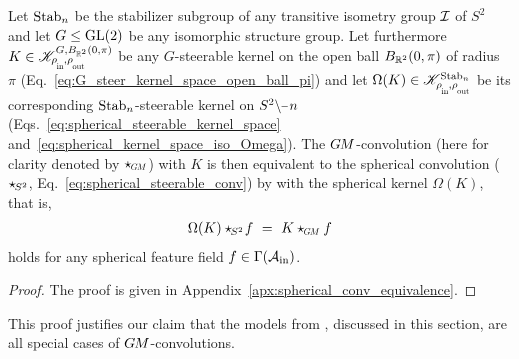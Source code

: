 \begin{thm}
\label{thm:spherical_conv_GM_conv}
    Let $\operatorname{Stab}_{n}$ be the stabilizer subgroup of any transitive isometry group $\mathcal{I}$ of $S^2$ and let $G \leq \operatorname{GL}(2)$ be any isomorphic structure group.
    Let furthermore $K \in \mathscr{K}^{G,B_{\R^2}(0,\pi)}_{\rhoin\mkern-1mu,\rhoout}$ be any $G$-steerable kernel on the open ball $B_{\mathbb{R}^2}(0,\pi)$ of radius $\pi$ (Eq.~\eqref{eq:G_steer_kernel_space_open_ball_pi})
    and let $\Omega(K) \in \mathscr{K}^{\Stab{n}}_{\rhoin\mkern-1mu,\rhoout}$ be its corresponding $\operatorname{Stab}_{n}$-steerable kernel on $S^2\backslash \mkern-1mu\minus\mkern1mu n$ (Eqs.~\eqref{eq:spherical_steerable_kernel_space} and~\eqref{eq:spherical_kernel_space_iso_Omega}).
    The $G\mkern-1.4muM$-convolution (here for clarity denoted by $\star_{\mkern-1mu\scalebox{.64}{$\GM$}}$) with $K$ is then equivalent to the spherical convolution ($\star_{\mkern-2mu S^2}$, Eq.~\eqref{eq:spherical_steerable_conv}) by \citet{Cohen2018-intertwiners} with the spherical kernel $\Omega(K)$, that is,
    \begin{align}
        \Omega(K) \star_{\mkern-2mu S^2}\! f\ =\ K \star_{\mkern-1mu\scalebox{.64}{$\GM$}} f
    \end{align}
    holds for any spherical feature field $f \in \Gamma(\mathcal{A}_\textup{in})$.
\end{thm}
\begin{proof}
    The proof is given in Appendix~\ref{apx:spherical_conv_equivalence}.
\end{proof}
This proof justifies our claim that the models from \cite{Cohen2018-S2CNN,esteves2018zonalSpherical,esteves2020spinweighted,kondor2018ClebschGordan}, discussed in this section, are all special cases of $G\mkern-1.4muM$-convolutions.
